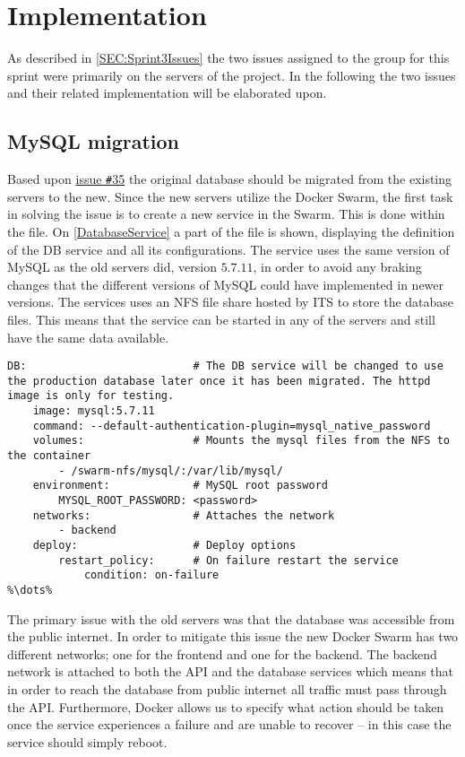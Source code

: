 \section{Implementation} \label{SEC:Sprint3Implementation}
As described in \autoref{SEC:Sprint3Issues} the two issues assigned to the group for this sprint were primarily on the servers of the project.
In the following the two issues and their related implementation will be elaborated upon.

\subsection{MySQL migration}
Based upon \href{https://github.com/aau-giraf/wiki/issues/35}{issue \texttt{\#}35} the original database should be migrated from the existing servers to the new.
Since the new servers utilize the Docker Swarm, the first task in solving the issue is to create a new service in the Swarm.
This is done within the  file.
On \autoref{DatabaseService} a part of the file is shown, displaying the definition of the DB service and all its configurations.
The service uses the same version of MySQL as the old servers did, version $5.7.11$, in order to avoid any braking changes that the different versions of MySQL could have implemented in newer versions.
The services uses an NFS file share hosted by ITS to store the database files.
This means that the service can be started in any of the servers and still have the same data available.

\begin{lstlisting}[caption={Docker database service},captionpos=b,label=DatabaseService,escapechar=\%]
%\dots%
DB:                          # The DB service will be changed to use the production database later once it has been migrated. The httpd image is only for testing.
    image: mysql:5.7.11
    command: --default-authentication-plugin=mysql_native_password
    volumes:                 # Mounts the mysql files from the NFS to the container
        - /swarm-nfs/mysql/:/var/lib/mysql/
    environment:             # MySQL root password
        MYSQL_ROOT_PASSWORD: <password>
    networks:                # Attaches the network
        - backend
    deploy:                  # Deploy options
        restart_policy:      # On failure restart the service
            condition: on-failure
%\dots%
\end{lstlisting}

The primary issue with the old servers was that the database was accessible from the public internet.
In order to mitigate this issue the new Docker Swarm has two different networks; one for the frontend and one for the backend.
The backend network is attached to both the API and the database services which means that in order to reach the database from public internet all traffic must pass through the API.
Furthermore, Docker allows us to specify what action should be taken once the service experiences a failure and are unable to recover -- in this case the service should simply reboot.

